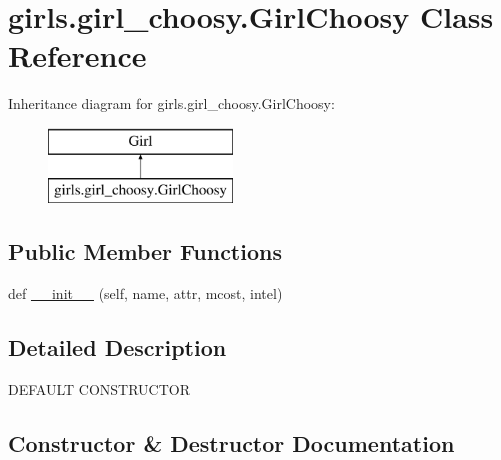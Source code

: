 \hypertarget{classgirls_1_1girl__choosy_1_1_girl_choosy}{}\section{girls.\+girl\+\_\+choosy.\+Girl\+Choosy Class Reference}
\label{classgirls_1_1girl__choosy_1_1_girl_choosy}
Inheritance diagram for girls.\+girl\+\_\+choosy.\+Girl\+Choosy\+:\begin{figure}[H]
\begin{center}
\leavevmode
\includegraphics[height=2.000000cm]{classgirls_1_1girl__choosy_1_1_girl_choosy}
\end{center}
\end{figure}
\subsection*{Public Member Functions}
\begin{DoxyCompactItemize}
\item 
def \hyperlink{classgirls_1_1girl__choosy_1_1_girl_choosy_a21596e588baf67cf1a7a62128b3ebd12}{\+\_\+\+\_\+init\+\_\+\+\_\+} (self, name, attr, mcost, intel)
\end{DoxyCompactItemize}


\subsection{Detailed Description}
\begin{DoxyVerb}DEFAULT CONSTRUCTOR\end{DoxyVerb}
 

\subsection{Constructor \& Destructor Documentation}

